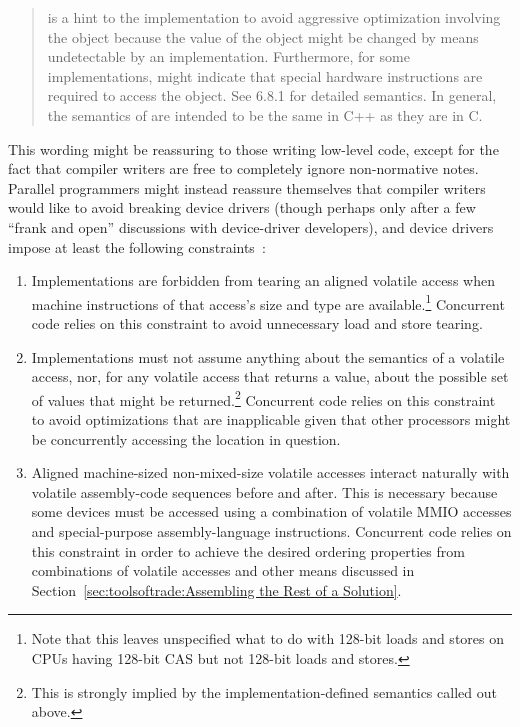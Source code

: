 \begin{quote}
	 is a hint to the implementation to avoid
	aggressive optimization involving the object because the value
	of the object might be changed by means undetectable by an
	implementation.
	Furthermore, for some implementations,  might indicate
	that special hardware instructions are required to access
	the object.
	See 6.8.1 for detailed semantics.
	In general, the semantics of  are intended to be the
	same in C++ as they are in C.
\end{quote}

This wording might be reassuring to those writing low-level code, except
for the fact that compiler writers are free to completely ignore
non-normative notes.
Parallel programmers might instead reassure themselves that compiler
writers would like to avoid breaking device drivers (though perhaps
only after a few ``frank and open'' discussions with device-driver
developers), and device drivers impose at least the following
constraints~\cite{PaulEMcKenney2016P0124R6-LKMM}:

\begin{enumerate}
\item	Implementations are forbidden from tearing an aligned volatile
	access when machine instructions of that access's size and type
	are available.\footnote{
		Note that this leaves unspecified what to do with 128-bit
		loads and stores on CPUs having 128-bit CAS but not
		128-bit loads and stores.}
	Concurrent code relies on this constraint to avoid unnecessary
	load and store tearing.
\item	Implementations must not assume anything about the semantics of
	a volatile access, nor, for any volatile access that returns a
	value, about the possible set of values that might be
	returned.\footnote{
		This is strongly implied by the implementation-defined
		semantics called out above.}
	Concurrent code relies on this constraint to avoid optimizations
	that are inapplicable given that other processors might be
	concurrently accessing the location in question.
\item	Aligned machine-sized non-mixed-size volatile accesses interact
	naturally with volatile assembly-code sequences before and after.
	This is necessary because some devices must be accessed using
	a combination of volatile MMIO accesses and special-purpose
	assembly-language instructions.
	Concurrent code relies on this constraint in order to achieve
	the desired ordering properties from combinations of volatile
	accesses and other means discussed in
	Section~\ref{sec:toolsoftrade:Assembling the Rest of a Solution}.
\end{enumerate}

